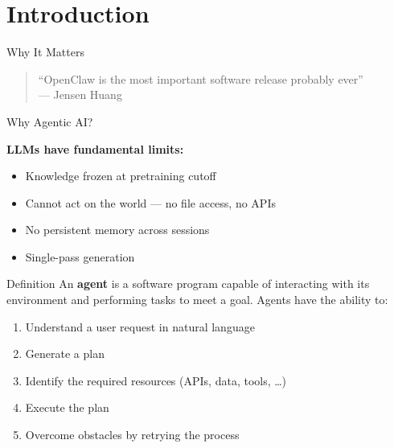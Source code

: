 \section{Introduction}

\begin{frame}{Why It Matters}

\begin{quote}
``OpenClaw is the most important software release probably ever''\\[0.4em]
\hfill --- Jensen Huang
\end{quote}

\end{frame}

\begin{frame}[t]{Why Agentic AI?}

\textbf{LLMs have fundamental limits:}
\begin{itemize}
  \item Knowledge frozen at pretraining cutoff
  \item Cannot act on the world — no file access, no APIs
  \item No persistent memory across sessions
  \item Single-pass generation
\end{itemize}

\vspace{0.4em}
\begin{block}{Definition}
An \textbf{agent} is a software program capable of interacting with its environment and performing tasks to meet a goal. Agents have the ability to:
\begin{enumerate}
  \item Understand a user request in natural language
  \item Generate a plan
  \item Identify the required resources (APIs, data, tools, \ldots)
  \item Execute the plan
  \item Overcome obstacles by retrying the process
\end{enumerate}
\end{block}

\end{frame}
